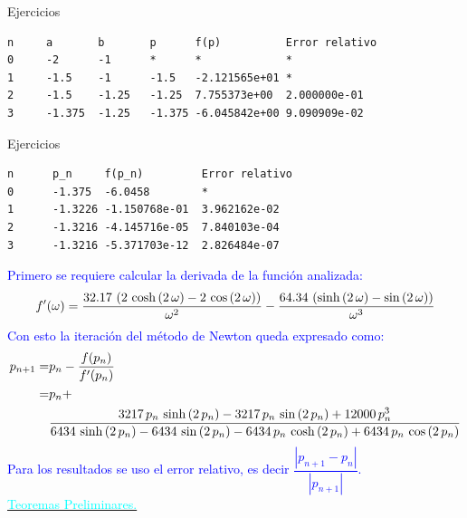 \begin{frame}[fragile]{Ejercicios}
\begin{itemize}
\end{itemize}
\pause
\small
\begin{lstlisting}[style=mystyle,backgroundcolor=\color{gray!30}]
n     a       b       p      f(p)          Error relativo
0     -2      -1      *      *             *
1     -1.5    -1      -1.5   -2.121565e+01 *
2     -1.5    -1.25   -1.25  7.755373e+00  2.000000e-01
3     -1.375  -1.25   -1.375 -6.045842e+00 9.090909e-02
\end{lstlisting}
\normalsize
\begin{itemize}
\end{itemize}
\end{frame}
\begin{frame}[fragile]{Ejercicios}
\small
\begin{lstlisting}[style=mystyle,backgroundcolor=\color{gray!30}]
n      p_n     f(p_n)         Error relativo
0      -1.375  -6.0458        *
1      -1.3226 -1.150768e-01  3.962162e-02
2      -1.3216 -4.145716e-05  7.840103e-04
3      -1.3216 -5.371703e-12  2.826484e-07
\end{lstlisting}
\normalsize
\textcolor{blue}{Primero se requiere calcular la derivada de la función analizada:
$$f'(\omega)={{32.17\,\left(2\,\cosh \left(2\,\omega\right)-2\,\cos \left(2\,\omega\right)
 \right)}\over{\omega^2}}-{{64.34\,\left(\sinh \left(2\,\omega\right)-\sin
 \left(2\,\omega\right)\right)}\over{\omega^3}}$$
 Con esto la iteración del método de Newton queda expresado como:
 \small
 \begin{align*}
 p_{n+1}=&p_{n}-\dfrac{f(p_n)}{f'(p_n)}\\
 =&p_n+\\
 &{{3217\,p_{n}\,\sinh \left(2\,p_{n}\right)-3217\,p_{n}\,\sin
 \left(2\,p_{n}\right)+12000\,p_{n}^3}\over{6434\,\sinh \left(2\,p_{n
 }\right)-6434\,\sin \left(2\,p_{n}\right)-6434\,p_{n}\,\cosh \left(2
 \,p_{n}\right)+6434\,p_{n}\,\cos \left(2\,p_{n}\right)}}
 \end{align*}
 \normalsize
 Para los resultados se uso el error relativo, es decir $\dfrac{|p_{n+1}-p_{n}|}{|p_{n+1}|}$.\\
}
\hyperlink{RetornoTeoremaPreliminares}{\textcolor{cyan}{Teoremas Preliminares.}} 
\end{frame}
